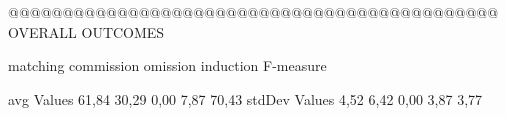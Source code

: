  @@@@@@@@@@@@@@@@@@@@@@@@@@@@@@@@@@@@@@@@@@@@@ OVERALL OUTCOMES

       matching commission   omission  induction  F-measure
      
avg Values      61,84      30,29       0,00      7,87    70,43       
stdDev Values    4,52       6,42       0,00       3,87     3,77       

